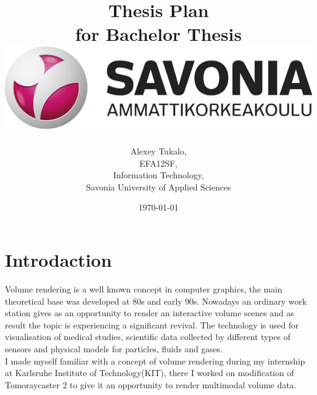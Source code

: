 \documentclass[english]{article}
\date{}
\begin{document}
\title{\vspace{2in}Thesis Plan\\
\small for Bachelor Thesis\\
\vspace{0.5in}\includegraphics{savonia.jpg}}

\nopagebreak
\maketitle


\vspace{3in}

\author{
\begin{flushright}
Alexey Tukalo,\\
EFA12SF,\\
Information Technology,\\
Savonia University of Applied Sciences
\end{flushright}
}

\date{\today}
\thispagestyle{empty}
\newpage
\setcounter{page}{1}

\section{Introdaction}

Volume rendering is a well known concept in computer graphics, the main theoretical base was developed at 80s and early 90s. Nowadays an ordinary work station gives as an opportunity to render an interactive volume scenes and as result the topic is experiencing a significant revival. The technology is used for visualisation of medical studies, scientific data collected by different types of sensors and physical models for particles, fluids and gases.\\

I made myself familiar with a concept of volume rendering during my internship at Karlsruhe Institute of Technology(KIT), there I worked on modification of Tomoraycaster 2 to give it an opportunity to render multimodal volume data.\\
\end{document}
